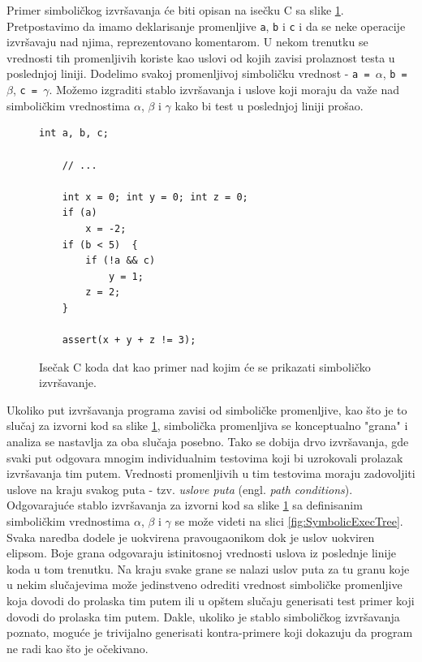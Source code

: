Primer simboličkog izvršavanja će biti opisan na isečku C sa slike \ref{fig:SymbolicExecCode}. Pretpostavimo da imamo deklarisanje promenljive \texttt{a}, \texttt{b} i \texttt{c} i da se neke operacije izvršavaju nad njima, reprezentovano komentarom. U nekom trenutku se vrednosti tih promenljivih koriste kao uslovi od kojih zavisi prolaznost testa u poslednjoj liniji. Dodelimo svakoj promenljivoj simboličku vrednost - \texttt{a = }$\alpha$, \texttt{b = }$\beta$, \texttt{c = }$\gamma$. Možemo izgraditi stablo izvršavanja i uslove koji moraju da važe nad simboličkim vrednostima $\alpha$, $\beta$ i $\gamma$ kako bi test u poslednjoj liniji prošao.

\begin{figure}[h!]
    \begin{lstlisting}[language={}]
    int a, b, c;

    // ...

    int x = 0; int y = 0; int z = 0;
    if (a)      
        x = -2;
    if (b < 5)  {
        if (!a && c)    
            y = 1;
        z = 2;
    }

    assert(x + y + z != 3);
    \end{lstlisting}
    \caption{Isečak C koda dat kao primer nad kojim će se prikazati simboličko izvršavanje.}
    \label{fig:SymbolicExecCode}
\end{figure}

Ukoliko put izvršavanja programa zavisi od simboličke promenljive, kao što je to slučaj za izvorni kod sa slike \ref{fig:SymbolicExecCode}, simbolička promenljiva se konceptualno "grana" i analiza se nastavlja za oba slučaja posebno. Tako se dobija drvo izvršavanja, gde svaki put odgovara mnogim individualnim testovima koji bi uzrokovali prolazak izvršavanja tim putem. Vrednosti promenljivih u tim testovima moraju zadovoljiti uslove na kraju svakog puta - tzv. \emph{uslove puta} (engl. \emph{path conditions}). Odgovarajuće stablo izvršavanja za izvorni kod sa slike \ref{fig:SymbolicExecCode} sa definisanim simboličkim vrednostima $\alpha$, $\beta$ i $\gamma$ se može videti na slici \ref{fig:SymbolicExecTree}. Svaka naredba dodele je uokvirena pravougaonikom dok je uslov uokviren elipsom. Boje grana odgovaraju istinitosnoj vrednosti uslova iz poslednje linije koda u tom trenutku. Na kraju svake grane se nalazi uslov puta za tu granu koje u nekim slučajevima može jedinstveno odrediti vrednost simboličke promenljive koja dovodi do prolaska tim putem ili u opštem slučaju generisati test primer koji dovodi do prolaska tim putem. Dakle, ukoliko je stablo simboličkog izvršavanja poznato, moguće je trivijalno generisati kontra-primere koji dokazuju da program ne radi kao što je očekivano.

